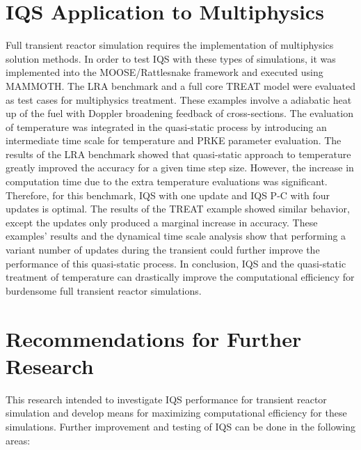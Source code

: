 \section{IQS Application to Multiphysics}

Full transient reactor simulation requires the implementation of multiphysics solution methods. In order to test IQS with these types of simulations, it was implemented into the MOOSE/Rattlesnake framework and executed using MAMMOTH. The LRA benchmark and a full core TREAT model were evaluated as test cases for multiphysics treatment. These examples involve a adiabatic heat up of the fuel with Doppler broadening feedback of cross-sections. The evaluation of temperature was integrated in the quasi-static process by introducing an intermediate time scale for temperature and PRKE parameter evaluation. The results of the LRA benchmark showed that quasi-static approach to temperature greatly improved the accuracy for a given time step size. However, the increase in computation time due to the extra temperature evaluations was significant. Therefore, for this benchmark, IQS with one update and IQS P-C with four updates is optimal. The results of the TREAT example showed similar behavior, except the updates only produced a marginal increase in accuracy. These examples' results and the dynamical time scale analysis show that performing a variant number of updates during the transient could further improve the performance of this quasi-static process. In conclusion, IQS and the quasi-static treatment of temperature can drastically improve the computational efficiency for burdensome full transient reactor simulations.

\section{Recommendations for Further Research}

This research intended to investigate IQS performance for transient reactor simulation and develop means for maximizing computational efficiency for these simulations. Further improvement and testing of IQS can be done in the following areas:

